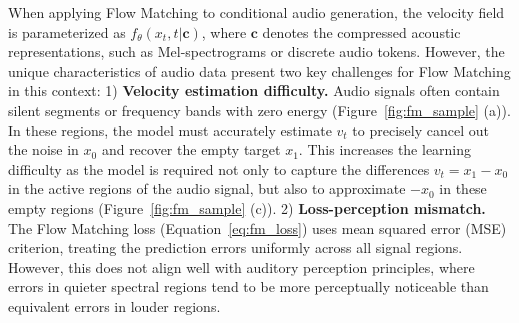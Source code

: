 \documentclass{article} %
\begin{document}
When applying Flow Matching to conditional audio generation, the velocity field is parameterized as $f_{\theta}(x_t, t|\mathbf{c})$, where $\mathbf{c}$ denotes the compressed acoustic representations, such as Mel-spectrograms or discrete audio tokens. 
However, the unique characteristics of audio data present two key challenges for Flow Matching in this context: 1) \textbf{Velocity estimation difficulty.} Audio signals often contain silent segments or frequency bands with zero energy (Figure~\ref{fig:fm_sample} (a)). In these regions, the model must accurately estimate $v_t$ to precisely cancel out the noise in $x_0$ and recover the empty target $x_1$. This increases the learning difficulty as the model is required not only to capture the differences $v_t = x_1 - x_0$ in the active regions of the audio signal, but also to approximate $-x_0$ in these empty regions (Figure~\ref{fig:fm_sample} (c)). 
2) \textbf{Loss-perception mismatch.} The Flow Matching loss (Equation~\ref{eq:fm_loss}) uses mean squared error (MSE) criterion, treating the prediction errors uniformly across all signal regions. However, this does not align well with auditory perception principles, where errors in quieter spectral regions tend to be more perceptually noticeable than equivalent errors in louder regions. 
\end{document}
